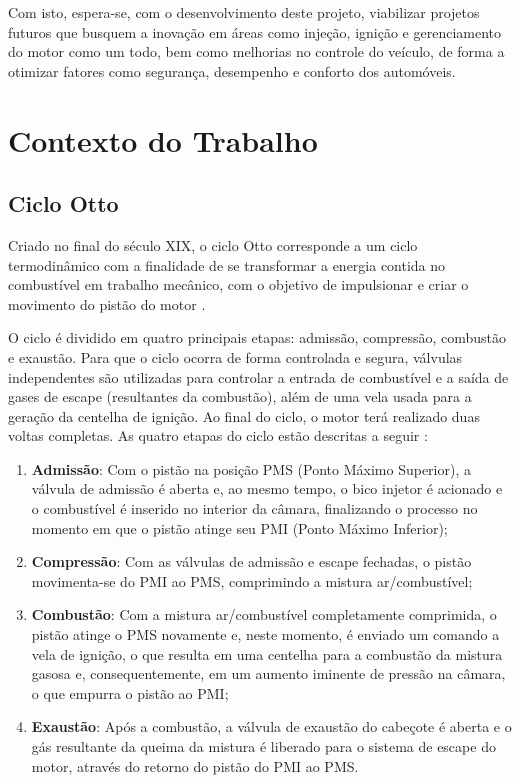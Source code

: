 	Com isto, espera-se, com o desenvolvimento deste projeto, viabilizar projetos futuros que busquem a inovação em áreas como injeção, ignição e gerenciamento do motor como um todo, bem como melhorias no controle do veículo, de forma a otimizar fatores como segurança, desempenho e conforto dos automóveis.
	
\section{Contexto do Trabalho}

\subsection{Ciclo Otto}

	Criado no final do século XIX, o ciclo Otto corresponde a um ciclo termodinâmico com a finalidade de se transformar a energia contida no combustível em trabalho mecânico, com o objetivo de impulsionar e criar o movimento do pistão do motor \cite{manavella}.
	
	O ciclo é dividido em quatro principais etapas: admissão, compressão, combustão e exaustão. Para que o ciclo ocorra de forma controlada e segura, válvulas independentes são utilizadas para controlar a entrada de combustível e a saída de gases de escape (resultantes da combustão), além de uma vela usada para a geração da centelha de ignição. Ao final do ciclo, o motor terá realizado duas voltas completas. As quatro etapas do ciclo estão descritas a seguir \cite{heywood1988internal}:

\begin{enumerate}
	\item \textbf{Admissão}: Com o pistão na posição PMS (Ponto Máximo Superior), a válvula de admissão é aberta e, ao mesmo tempo, o bico injetor é acionado e o combustível é inserido no interior da câmara, finalizando o processo no momento em que o pistão atinge seu PMI (Ponto Máximo Inferior);
	\item \textbf{Compressão}: Com as válvulas de admissão e escape fechadas, o pistão movimenta-se do PMI ao PMS, comprimindo a mistura ar/combustível;
	\item \textbf{Combustão}: Com a mistura ar/combustível completamente comprimida, o pistão atinge o PMS novamente e, neste momento, é enviado um comando a vela de ignição, o que resulta em uma centelha para a combustão da mistura gasosa e, consequentemente, em um aumento iminente de pressão na câmara, o que empurra o pistão ao PMI;
	\item \textbf{Exaustão}: Após a combustão, a válvula de exaustão do cabeçote é aberta e o gás resultante da queima da mistura é liberado para o sistema de escape do motor, através do retorno do pistão do PMI ao PMS.
\end{enumerate}


